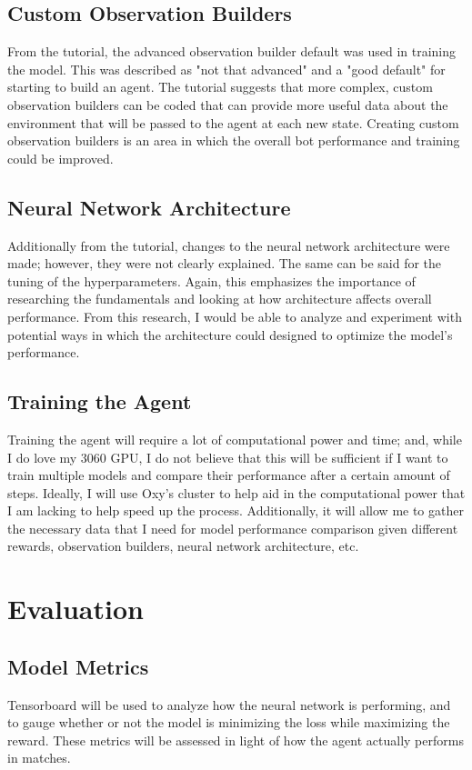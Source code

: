 \documentclass[10pt,twocolumn]{article}
\begin{document}
\subsection{Custom Observation Builders}

From the tutorial, the advanced observation builder default was used in training the model. This was described as "not that advanced" and a "good default" for starting to build an agent. The tutorial suggests that more complex, custom observation builders can be coded that can provide more useful data about the environment that will be passed to the agent at each new state. Creating custom observation builders is an area in which the overall bot performance and training could be improved.

\subsection{Neural Network Architecture}
Additionally from the tutorial, changes to the neural network architecture were made; however, they were not clearly explained. The same can be said for the tuning of the hyperparameters. Again, this emphasizes the importance of researching the fundamentals and looking at how architecture affects overall performance. From this research, I would be able to analyze and experiment with potential ways in which the architecture could designed to optimize the model's performance. 

\subsection{Training the Agent}

Training the agent will require a lot of computational power and time; and, while I do love my 3060 GPU, I do not believe that this will be sufficient if I want to train multiple models and compare their performance after a certain amount of steps. Ideally, I will use Oxy's cluster to help aid in the computational power that I am lacking to help speed up the process. Additionally, it will allow me to gather the necessary data that I need for model performance comparison given different rewards, observation builders, neural network architecture, etc. 

\section{Evaluation}

\subsection{Model Metrics}
Tensorboard will be used to analyze how the neural network is performing, and to gauge whether or not the model is minimizing the loss while maximizing the reward. These metrics will be assessed in light of how the agent actually performs in matches. 
\end{document}
